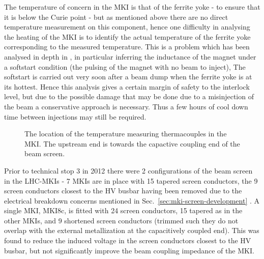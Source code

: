 The temperature of concern in the MKI is that of the ferrite yoke - to ensure that it is below the Curie point - but as mentioned above there are no direct temperature measurement on this component, hence one difficulty in analysing the heating of the MKI is to identify the actual temperature of the ferrite yoke corresponding to the measured temperature. This is a problem which has been analysed in depth in \cite{Barnes:mkiHeating}, in particular inferring the inductance of the magnet under a softstart condition (the pulsing of the magnet with no beam to inject), The softstart is carried out very soon after a beam dump when the ferrite yoke is at its hottest. Hence this analysis gives a certain margin of safety to the interlock level, but due to the possible damage that may be done due to a misinjection of the beam a conservative approach is necessary. Thus a few hours of cool down time between injections may still be required.

\begin{figure}
\caption{The location of the temperature measuring thermacouples in the MKI. The upstream end is towards the capactive coupling end of the beam screen.}
\label{fig:mki-thermacouple-location}
\end{figure}

Prior to technical stop 3 in 2012 there were 2 configurations of the beam screen in the LHC-MKIs - 7 MKIs are in place with 15 tapered screen conductors, the 9 screen conductors closest to the HV busbar having been removed due to the electrical breakdown concerns mentioned in Sec.~\ref{sec:mki-screen-development} \cite{Barnes:improvBeamScreen}. A single MKI, MKI8c, is fitted with 24 screen conductors, 15 tapered as in the other MKIs, and 9 shortened screen conductors (trimmed such they do not overlap with the external metallization at the capacitively coupled end). This was found to reduce the induced voltage in the screen conductors closest to the HV busbar, but not significantly improve the beam coupling impedance of the MKI.